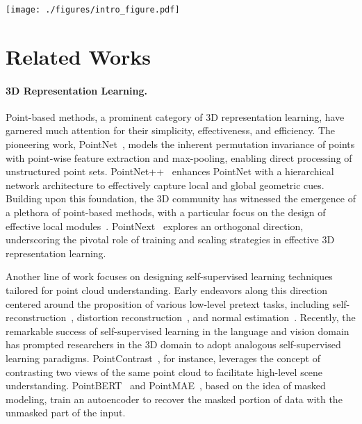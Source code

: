 \documentclass{article} \usepackage{iclr2024_conference,times}
\makeatletter
\newcommand{\ourmethod}{MixCon3D}
\newcommand{\red}[1]{\textcolor[rgb]{0.9,0.0,0.0}{\@#1}}
\newcommand{\blue}[1]{\textcolor[rgb]{0.0,0.0,0.9}{\@#1}}
\makeatother
\begin{document}
\begin{figure*}[!t]
  \centering
  \texttt{[image: ./figures/intro\_figure.pdf]}
  \vspace{-2em}
   \caption{Comparison of zero-shot point cloud recognition between the OpenShape (\blue{blue}) and our \ourmethod~(\red{red}) under different pre-training datasets (ShapeNet, Ensemble (No LVIS) and Ensemble). 
   Our model obtains consistent improvements on different types of training datasets on various downstream benchmarks.}
   \vspace{-1em}
   \label{fig:intro}
\end{figure*}
\section{Related Works}
\label{sec:related_works}
\paragraph{3D Representation Learning.}
Point-based methods, a prominent category of 3D representation learning, have garnered much attention for their simplicity, effectiveness, and efficiency. 
The pioneering work, PointNet~\citep{pointnet}, models the inherent permutation invariance of points with point-wise feature extraction and max-pooling, enabling direct processing of unstructured point sets.
PointNet++~\citep{pointnet++} enhances PointNet with a hierarchical network architecture to effectively capture local and global geometric cues. 
Building upon this foundation, the 3D community has witnessed the emergence of a plethora of point-based methods, with a particular focus on the design of effective local modules~\citep{pu-gcn,dynGCN,gcn_attn,KPconv,Tangent,spidercnn,relationconv,point_transformer}.
PointNext~\citep{pointnext} explores an orthogonal direction, underscoring the pivotal role of training and scaling strategies in effective 3D representation learning.

Another line of work focuses on designing self-supervised learning techniques tailored for point cloud understanding. Early endeavors along this direction centered around the proposition of various low-level pretext tasks, including self-reconstruction~\citep{achlioptas2018learning,deng2018ppf}, distortion reconstruction~\citep{sauder2019self,mersch2022self}, and normal estimation~\citep{rao2020global}.
Recently, the remarkable success of self-supervised learning in the language and vision domain has prompted researchers in the 3D domain to adopt analogous self-supervised learning paradigms. 
PointContrast~\citep{xie2020pointcontrast}, for instance, leverages the concept of contrasting two views of the same point cloud to facilitate high-level scene understanding. 
PointBERT~\citep{point-bert} and PointMAE~\citep{pang2022masked}, based on the idea of masked modeling, train an autoencoder to recover the masked portion of data with the unmasked part of the input. 
\end{document}

